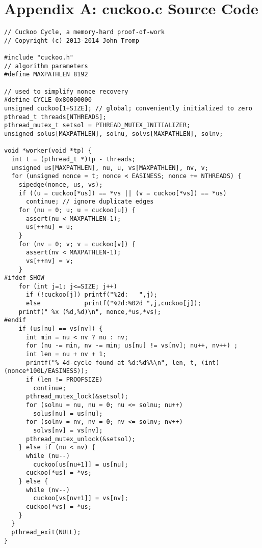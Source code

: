 \documentclass[11pt, oneside]{article}
\begin{document}
\section{Appendix A: cuckoo.c Source Code}
\footnotesize
\begin{verbatim}
// Cuckoo Cycle, a memory-hard proof-of-work
// Copyright (c) 2013-2014 John Tromp

#include "cuckoo.h"
// algorithm parameters
#define MAXPATHLEN 8192

// used to simplify nonce recovery
#define CYCLE 0x80000000
unsigned cuckoo[1+SIZE]; // global; conveniently initialized to zero
pthread_t threads[NTHREADS];
pthread_mutex_t setsol = PTHREAD_MUTEX_INITIALIZER;
unsigned solus[MAXPATHLEN], solnu, solvs[MAXPATHLEN], solnv; 

void *worker(void *tp) {
  int t = (pthread_t *)tp - threads;
  unsigned us[MAXPATHLEN], nu, u, vs[MAXPATHLEN], nv, v; 
  for (unsigned nonce = t; nonce < EASINESS; nonce += NTHREADS) {
    sipedge(nonce, us, vs);
    if ((u = cuckoo[*us]) == *vs || (v = cuckoo[*vs]) == *us)
      continue; // ignore duplicate edges
    for (nu = 0; u; u = cuckoo[u]) {
      assert(nu < MAXPATHLEN-1);
      us[++nu] = u;
    }
    for (nv = 0; v; v = cuckoo[v]) {
      assert(nv < MAXPATHLEN-1);
      vs[++nv] = v;
    }
#ifdef SHOW
    for (int j=1; j<=SIZE; j++)
      if (!cuckoo[j]) printf("%2d:   ",j);
      else            printf("%2d:%02d ",j,cuckoo[j]);
    printf(" %x (%d,%d)\n", nonce,*us,*vs);
#endif
    if (us[nu] == vs[nv]) {
      int min = nu < nv ? nu : nv;
      for (nu -= min, nv -= min; us[nu] != vs[nv]; nu++, nv++) ;
      int len = nu + nv + 1;
      printf("% 4d-cycle found at %d:%d%%\n", len, t, (int)(nonce*100L/EASINESS));
      if (len != PROOFSIZE)
        continue;
      pthread_mutex_lock(&setsol);
      for (solnu = nu, nu = 0; nu <= solnu; nu++)
        solus[nu] = us[nu];
      for (solnv = nv, nv = 0; nv <= solnv; nv++)
        solvs[nv] = vs[nv];
      pthread_mutex_unlock(&setsol);
    } else if (nu < nv) {
      while (nu--)
        cuckoo[us[nu+1]] = us[nu];
      cuckoo[*us] = *vs;
    } else {
      while (nv--)
        cuckoo[vs[nv+1]] = vs[nv];
      cuckoo[*vs] = *us;
    }
  }
  pthread_exit(NULL);
}


\end{verbatim}
\end{document}
